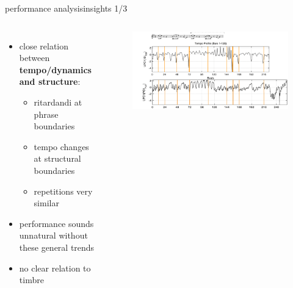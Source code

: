         \begin{frame}{performance analysis}{insights 1/3}
            \vspace{-5mm}
            \begin{columns}
            \begin{itemize}
                \item close relation between \textbf{tempo/dynamics and structure}:
                    \begin{itemize}
                        \item	ritardandi at phrase boundaries
                        \item   tempo changes at structural boundaries 
                        \item   repetitions very similar
                    \end{itemize}
                \item   performance sounds unnatural without these general trends
                \item   no clear relation to timbre
            \end{itemize}
            
                \begin{figure}
                   \includegraphics[width=\columnwidth]{graph/tempo_loudness}
                \end{figure}
            \end{columns}
       \end{frame}
